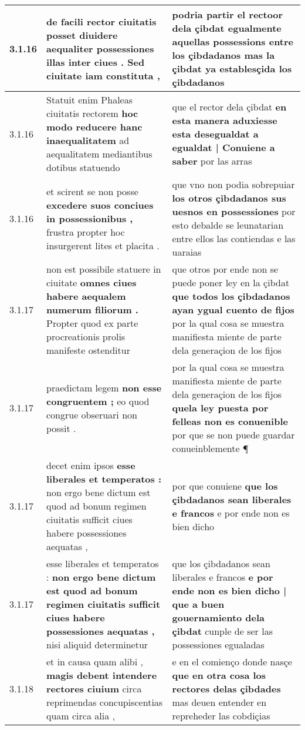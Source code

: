 \begin{tabular}{|p{1cm}|p{6.5cm}|p{6.5cm}|}
3.1.16 & de facili rector ciuitatis posset \textbf{ diuidere aequaliter possessiones illas inter ciues . } Sed ciuitate iam constituta , & podria partir el rectoor dela çibdat \textbf{ egualmente aquellas possessions entre los çibdadanos } mas la çibdat ya establesçida los çibdadanos \\\hline
3.1.16 & Statuit enim Phaleas ciuitatis rectorem \textbf{ hoc modo reducere hanc inaequalitatem } ad aequalitatem mediantibus dotibus statuendo & que el rector dela çibdat \textbf{ en esta manera aduxiesse esta desegualdat a egualdat | Conuiene a saber } por las arras \\\hline
3.1.16 & et scirent se non posse \textbf{ excedere suos conciues in possessionibus , } frustra propter hoc insurgerent lites et placita . & que vno non podia sobrepuiar \textbf{ los otros çibdadanos sus uesnos en possessiones } por esto debalde se leunatarian entre ellos las contiendas e las uaraias \\\hline
3.1.17 & non est possibile statuere in ciuitate \textbf{ omnes ciues habere aequalem numerum filiorum . } Propter quod ex parte procreationis prolis manifeste ostenditur & que otros por ende non se puede poner ley en la çibdat \textbf{ que todos los çibdadanos ayan ygual cuento de fijos } por la qual cosa se muestra manifiesta miente de parte dela generaçion de los fijos \\\hline
3.1.17 & praedictam legem \textbf{ non esse congruentem ; } eo quod congrue obseruari non possit . & por la qual cosa se muestra manifiesta miente de parte dela generaçion de los fijos \textbf{ quela ley puesta por felleas non es conuenible } por que se non puede guardar conueinblemente ¶ \\\hline
3.1.17 & decet enim ipsos \textbf{ esse liberales et temperatos : } non ergo bene dictum est quod ad bonum regimen ciuitatis sufficit ciues habere possessiones aequatas , & por que conuiene \textbf{ que los çibdadanos sean liberales e francos } e por ende non es bien dicho \\\hline
3.1.17 & esse liberales et temperatos : \textbf{ non ergo bene dictum est quod ad bonum regimen ciuitatis sufficit ciues habere possessiones aequatas , } nisi aliquid determinetur & que los çibdadanos sean liberales e francos \textbf{ e por ende non es bien dicho | que a buen gouernamiento dela çibdat } cunple de ser las possessiones egualadas \\\hline
3.1.18 & et in causa quam alibi , \textbf{ magis debent intendere rectores ciuium } circa reprimendas concupiscentias quam circa alia , & e en el comienço donde nasçe \textbf{ que en otra cosa los rectores delas çibdades } mas deuen entender en repreheder las cobdiçias \\\hline

\end{tabular}
